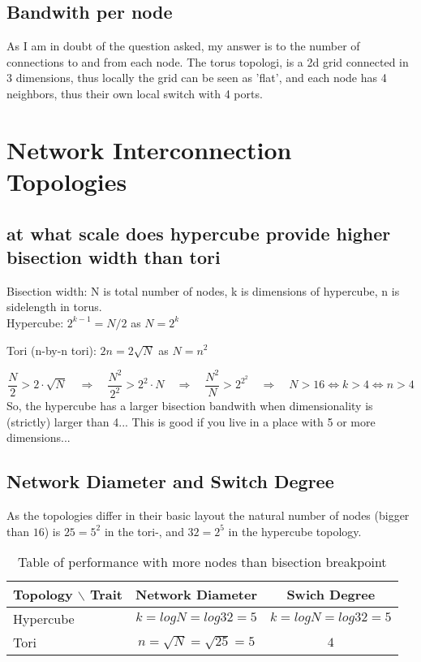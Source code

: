 \documentclass[a4paper,10pt]{article}
\begin{document}
\subsection{Bandwith per node}
As I am in doubt of the question asked, my answer is to the number of connections to and from each node.
The torus topologi, is a 2d grid connected in 3 dimensions, thus locally the grid can be seen as 'flat', and each node has 4 neighbors, thus their own local switch with 4 ports.

\newpage

\section{Network Interconnection Topologies}

\subsection{at what scale does hypercube provide higher bisection width than tori}

Bisection width:  N is total number of nodes, k is dimensions of hypercube, n is sidelength in torus.\\

Hypercube: $ 2^{k-1} = N/2 $ as $ N = 2^k $ 

Tori (n-by-n tori): $ 2n = 2 \sqrt{N} $ as $ N = n^2 $

$$
   \frac{N}{2} > 2 \cdot \sqrt{N} \quad \Rightarrow \quad 
   \frac{N^2}{2^2} > 2^2 \cdot N \quad \Rightarrow \quad 
   \frac{N^2}{N} > 2^{2^2} \quad \Rightarrow \quad 
   N > 16 \iff  k > 4 \iff  n > 4
$$
So, the hypercube has a larger bisection bandwith when dimensionality is (strictly) larger than 4...
This is good if you live in a place with 5 or more dimensions...

\subsection{Network Diameter and Switch Degree}
As the topologies differ in their basic layout the natural number of nodes (bigger than $16$) is $25=5^2$ in the tori-, and $32=2^5$ in the hypercube topology.
 
\begin{table}[h!]
  \centering
  \begin{tabular}{|l|c|c|}
    \hline
    Topology $\backslash$ Trait & Network Diameter & Swich Degree \\ \hline
    Hypercube & $k = log N = log 32 = 5$ & $k = log N = log 32 = 5$  \\
    Tori & $ n = \sqrt{N} = \sqrt{25} = 5 $ & $ 4 $ \\ \hline
  \end{tabular}
  \caption{Table of performance with more nodes than bisection breakpoint}
  \label{tab:tori_vs_hypercube}
\end{table}
\end{document}
